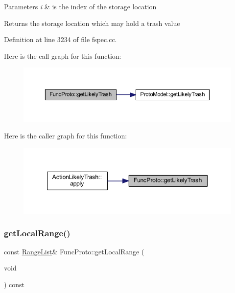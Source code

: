 \begin{DoxyParams}{Parameters}
{\em i} & is the index of the storage location \\
\hline
\end{DoxyParams}
\begin{DoxyReturn}{Returns}
the storage location which may hold a trash value 
\end{DoxyReturn}


Definition at line 3234 of file fspec.\+cc.

Here is the call graph for this function\+:
\nopagebreak
\begin{figure}[H]
\begin{center}
\leavevmode
\includegraphics[width=350pt]{class_func_proto_a078b7588849b80acc7c1d1ba13cda5f3_cgraph}
\end{center}
\end{figure}
Here is the caller graph for this function\+:
\nopagebreak
\begin{figure}[H]
\begin{center}
\leavevmode
\includegraphics[width=347pt]{class_func_proto_a078b7588849b80acc7c1d1ba13cda5f3_icgraph}
\end{center}
\end{figure}
\mbox{\label{class_func_proto_ad8bbc6db7bc4ae8105688a0321fa1ae4}} 
\subsubsection{\texorpdfstring{getLocalRange()}{getLocalRange()}}
{\footnotesize\ttfamily const \mbox{\hyperlink{class_range_list}{Range\+List}}\& Func\+Proto\+::get\+Local\+Range (\begin{DoxyParamCaption}\item[{void}]{ }\end{DoxyParamCaption}) const\hspace{0.3cm}{\ttfamily [inline]}}



